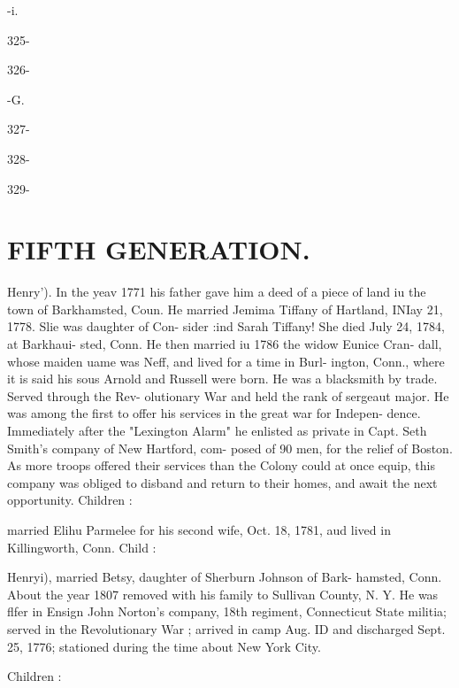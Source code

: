 \documentclass{book}
\begin{document}
-i. 


325- 




326- 


-G. 


327- 




328- 




329- 





\section{FIFTH GENERATION.}


Henry'). In the yeav 1771 his father gave him a deed of a piece 
of land iu the town of Barkhamsted, Coun. He married Jemima 
Tiffany of Hartland, INIay 21, 1778. Slie was daughter of Con- 
sider :ind Sarah Tiffany! She died July 24, 1784, at Barkhaui- 
sted, Conn. He then married iu 1786 the widow Eunice Cran- 
dall, whose maiden uame was Neff, and lived for a time in Burl- 
ington, Conn., where it is said his sous Arnold and Russell were 
born. He was a blacksmith by trade. Served through the Rev- 
olutionary War and held the rank of sergeaut major. He was 
among the first to offer his services in the great war for Indepen- 
dence. Immediately after the "Lexington Alarm" he enlisted 
as private in Capt. Seth Smith's company of New Hartford, com- 
posed of 90 men, for the relief of Boston. As more troops 
offered their services than the Colony could at once equip, this 
company was obliged to disband and return to their homes, and 
await the next opportunity. Children : 






married Elihu Parmelee for his second wife, Oct. 18, 1781, aud 
lived in Killingworth, Conn. Child : 


Henryi), married Betsy, daughter of Sherburn Johnson of Bark- 
hamsted, Conn. About the year 1807 removed with his family 
to Sullivan County, N. Y. He was flfer in Ensign John Norton's 
company, 18th regiment, Connecticut State militia; served in the 
Revolutionary War ; arrived in camp Aug. ID and discharged 
Sept. 25, 1776; stationed during the time about New York City. 

Children : 
\end{document}
